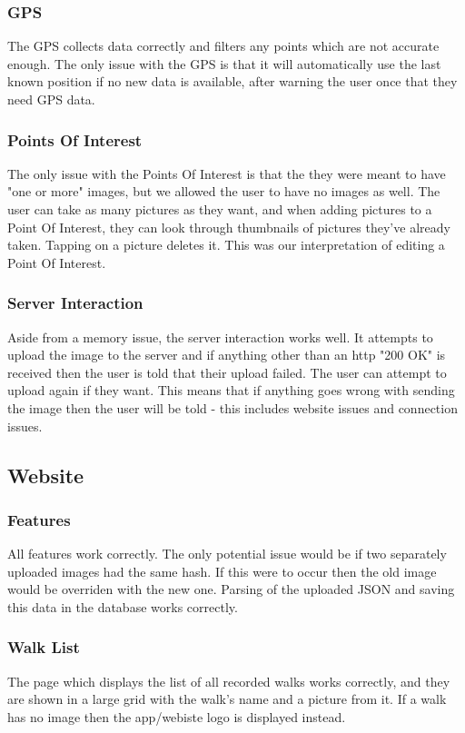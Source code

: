 \documentclass{project}
\begin{document}
\subsubsection{GPS}
The GPS collects data correctly and filters any points which are not accurate enough. The only issue
with the GPS is that it will automatically use the last known position if no new data is available, after
warning the user once that they need GPS data.


\subsubsection{Points Of Interest}
The only issue with the Points Of Interest is that the they were meant to have "one or more" images, but we allowed the
user to have no images as well.
The user can take as many pictures as they want, and when adding pictures to a Point Of Interest, they can look through thumbnails
of pictures they've already taken. Tapping on a picture deletes it. This was our interpretation of editing a Point Of Interest.

\subsubsection{Server Interaction}
Aside from a memory issue, the server interaction works well. It attempts to upload the image to the server and if anything
other than an http "200 OK" is received then the user is told that their upload failed. The user can attempt to upload again
if they want. This means that if anything goes wrong with sending the image then the user will be told - this includes website
issues and connection issues.


\subsection{Website}
\subsubsection{Features}
All features work correctly. The only potential issue would be if two separately uploaded images had the same hash. If this
were to occur then the old image would be overriden with the new one.
Parsing of the uploaded JSON and saving this data in the database works correctly.

\subsubsection{Walk List}
The page which displays the list of all recorded walks works correctly, and they are shown in a large grid with the walk's
name and a picture from it.
If a walk has no image then the app/webiste logo is displayed instead.
\end{document}
